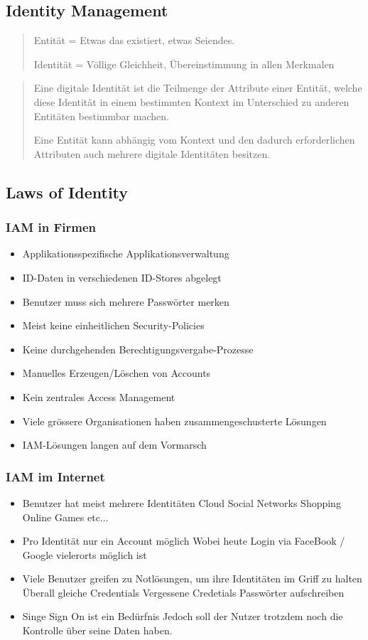 \documentclass[a4paper, 11pt]{article}
\begin{document}
\subsection{Identity Management}
\blockquote{Entität = Etwas das existiert, etwas Seiendes.
	
	Identität = Völlige Gleichheit, Übereinstimmung in allen Merkmalen}

\blockquote{Eine digitale Identität ist die Teilmenge der Attribute einer Entität, welche diese Identität in einem bestimmten Kontext im Unterschied zu anderen Entitäten bestimmbar machen.

Eine Entität kann abhängig vom Kontext und den dadurch erforderlichen Attributen auch mehrere digitale Identitäten besitzen.}

\subsection{Laws of Identity}


\subsubsection{IAM in Firmen}
\begin{itemize}
	\item Applikationsspezifische Applikationsverwaltung
	\item ID-Daten in verschiedenen ID-Stores abgelegt
	\item Benutzer muss sich mehrere Passwörter merken
	\item Meist keine einheitlichen Security-Policies
	\item Keine durchgehenden Berechtigungsvergabe-Prozesse
	\item Manuelles Erzeugen/Löschen von Accounts
	\item Kein zentrales Access Management
	\item Viele grössere Organisationen haben zusammengeschusterte Lösungen
	\item IAM-Lösungen langen auf dem Vormarsch
\end{itemize}

\subsubsection{IAM im Internet}
\begin{itemize}
	\item Benutzer hat meist mehrere Identitäten
		\subitem Cloud
		\subitem Social Networks
		\subitem Shopping
		\subitem Online Games
		\subitem etc...
	\item Pro Identität nur ein Account möglich
		\subitem Wobei heute Login via FaceBook / Google vielerorts möglich ist
	\item Viele Benutzer greifen zu Notlösungen, um ihre Identitäten im Griff zu halten
		\subitem Überall gleiche Credentials
		\subitem Vergessene Credetials
		\subitem Passwörter aufschreiben
	\item Singe Sign On ist ein Bedürfnis
		\subitem Jedoch soll der Nutzer trotzdem noch die Kontrolle über seine Daten haben.
\end{itemize}
\end{document}
